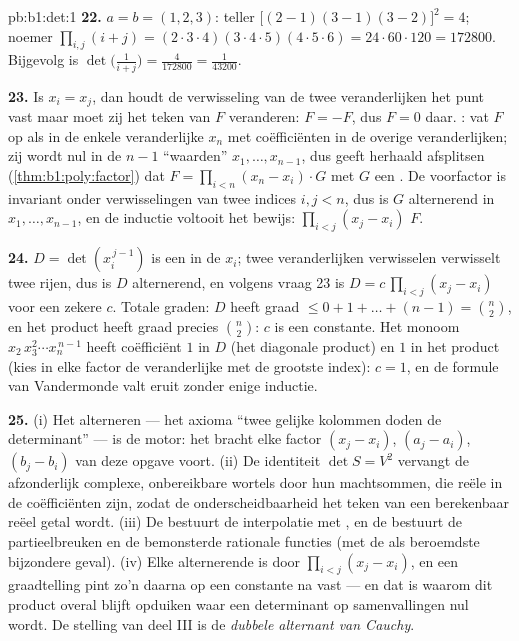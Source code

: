 \begin{solution}{pb:b1:det:1}
\textbf{22.} $a = b = (1, 2, 3)$: teller $\bigl[(2-1)(3-1)
(3-2)\bigr]^2 = 4$; noemer $\prod_{i,j}(i + j) =
(2\cdot3\cdot4)(3\cdot4\cdot5)(4\cdot5\cdot6) = 24\cdot60\cdot120 =
172800$. Bijgevolg is $\det\bigl(\frac1{i+j}\bigr) =
\frac{4}{172800} = \frac1{43200}$.

\textbf{23.} Is $x_i = x_j$, dan houdt de verwisseling van de twee
veranderlijken het punt vast maar moet zij het teken van $F$
veranderen: $F = -F$, dus $F = 0$ daar. : vat $F$ op
als  in de enkele veranderlijke $x_n$ met coëfficiënten in
de overige veranderlijken; zij wordt nul in de $n - 1$ ``waarden''
$x_1, \dots, x_{n-1}$, dus geeft herhaald afsplitsen
(\cref{thm:b1:poly:factor}) dat $F = \prod_{i<n}(x_n - x_i)\cdot G$
met $G$ een . De voorfactor is invariant onder
verwisselingen van twee indices $i, j < n$, dus is $G$ alternerend
in $x_1, \dots, x_{n-1}$, en de inductie voltooit het bewijs:
$\prod_{i<j}(x_j - x_i)$  $F$.

\textbf{24.} $D = \det(x_i^{\,j-1})$ is een  in de $x_i$;
twee veranderlijken verwisselen verwisselt twee rijen, dus is $D$
alternerend, en volgens vraag 23 is $D = c\,\prod_{i<j}(x_j - x_i)$
voor een zekere  $c$. Totale graden: $D$ heeft graad $\leq 0
+ 1 + \dots + (n-1) = \binom n2$, en het product heeft graad precies
$\binom n2$: $c$ is een constante. Het monoom $x_2\,x_3^2\cdots
x_n^{\,n-1}$ heeft coëfficiënt $1$ in $D$ (het diagonale product) en
$1$ in het product (kies in elke factor de veranderlijke met de
grootste index): $c = 1$, en de formule van Vandermonde valt eruit
zonder enige inductie.

\textbf{25.} (i) Het alterneren --- het axioma ``twee gelijke
kolommen doden de determinant'' --- is de motor: het bracht elke
factor $(x_j - x_i)$, $(a_j - a_i)$, $(b_j - b_i)$ van deze opgave
voort. (ii) De identiteit $\det S = V^2$ vervangt de afzonderlijk
complexe, onbereikbare wortels door hun machtsommen, die reële
 in de coëfficiënten zijn, zodat de onderscheidbaarheid
het teken van een berekenbaar reëel getal wordt. (iii) De
 bestuurt de interpolatie met , en
de  bestuurt de partieelbreuken en de bemonsterde
rationale functies (met de  als beroemdste bijzondere
geval). (iv) Elke alternerende  is  door
$\prod_{i<j}(x_j - x_i)$, en een graadtelling pint zo'n 
daarna op een constante na vast --- en dat is waarom dit product
overal blijft opduiken waar een determinant op samenvallingen nul
wordt. De stelling van deel III is de \emph{dubbele alternant van
Cauchy}.
\end{solution}

